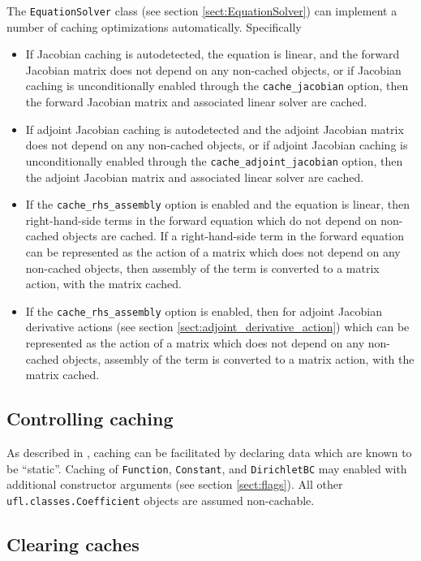 \documentclass[11pt]{article}
\begin{document}
The \texttt{EquationSolver} class (see section \ref{sect:EquationSolver}) can
implement a number of caching optimizations automatically. Specifically
\begin{itemize}
  \item If Jacobian caching is autodetected, the equation is linear, and the
    forward Jacobian matrix does not depend on any non-cached objects, or if
    Jacobian caching is unconditionally enabled through the
    \texttt{cache\_jacobian} option, then the forward Jacobian matrix and
    associated linear solver are cached. 
  \item If adjoint Jacobian caching is autodetected and the adjoint Jacobian
    matrix does not depend on any non-cached objects, or if adjoint Jacobian
    caching is unconditionally enabled through the
    \texttt{cache\_adjoint\_jacobian} option, then the adjoint Jacobian matrix
    and associated linear solver are cached.
  \item If the \texttt{cache\_rhs\_assembly} option is enabled and the equation
    is linear, then right-hand-side terms in the forward equation which do not
    depend on non-cached objects are cached. If a right-hand-side term in the
    forward equation can be represented as the action of a matrix which does
    not depend on any non-cached objects, then assembly of the term is
    converted to a matrix action, with the matrix cached.
  \item If the \texttt{cache\_rhs\_assembly} option is enabled, then for
    adjoint Jacobian derivative actions (see section
    \ref{sect:adjoint_derivative_action}) which can be represented as the
    action of a matrix which does not depend on any non-cached objects,
    assembly of the term is converted to a matrix action, with the matrix
    cached.
\end{itemize}

\subsection{Controlling caching}\label{sect:static}

As described in \citet{maddison2014}, caching can be facilitated by declaring
data which are known to be ``static''. Caching of \texttt{Function},
\texttt{Constant}, and \texttt{DirichletBC} may enabled with additional
constructor arguments (see section \ref{sect:flags}). All other
\texttt{ufl.classes.Coefficient} objects are assumed non-cachable.

\subsection{Clearing caches}\label{sect:clear_caches}
\end{document}
